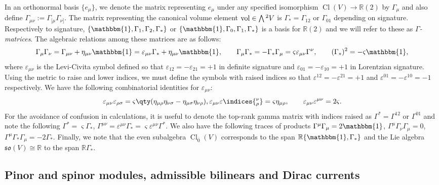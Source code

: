 \documentclass[pdftex]{sigma}
\numberwithin{equation}{section}
\newcommand{\fso}{\mathfrak{so}}
\newcommand{\RR}{\mathbb{R}}
\newcommand{\Wedge}{\mathchoice{{\textstyle\bigwedge}}{\bigwedge}{\bigwedge}{\bigwedge}}	%
\newcommand{\1}{\mathbbm{1}}
\DeclareMathOperator{\Cl}{Cl}
\DeclareMathOperator{\vol}{vol}
\begin{document}
In an orthonormal basis $\{e_\mu\}$, we denote the matrix representing $e_\mu$ under any specified isomorphism $\Cl(V)\to\RR(2)$ by $\Gamma_\mu$ and also define $\Gamma_{\mu\nu}:=\Gamma_{[\mu}\Gamma_{\nu]}$. The matrix representing the canonical volume element $\vol\in\Wedge^2 V$ is $\Gamma_*=\Gamma_{12}$ or $\Gamma_{01}$ depending on signature. Respectively to signature, $\{\1,\Gamma_1,\Gamma_2,\Gamma_*\}$ or $\{\1,\Gamma_0,\Gamma_1,\Gamma_*\}$ is a basis for $\RR(2)$ and we will refer to these as \emph{$\Gamma$-matrices}. The algebraic relations among these matrices are as follows:
\[
	\Gamma_{\mu}\Gamma_{\nu} = \Gamma_{\mu\nu} + \eta_{\mu\nu}\1 = \varepsilon_{\mu\nu}\Gamma_* + \eta_{\mu\nu}\1,
	\qquad	\Gamma_\mu \Gamma_* = -\Gamma_* \Gamma_\mu = \varsigma \varepsilon_{\mu\nu}\Gamma^\nu,
	\qquad (\Gamma_*)^2 = -\varsigma\1,
\]
where $\varepsilon_{\mu\nu}$ is the Levi-Civita symbol defined so that $\varepsilon_{12}=-\varepsilon_{21}=+1$ in definite signature and $\varepsilon_{01}=-\varepsilon_{10}=+1$ in Lorentzian signature. Using the metric to raise and lower indices, we must define the symbols with raised indices so that $\varepsilon^{12}=-\varepsilon^{21}=+1$ and $\varepsilon^{01}=-\varepsilon^{10}=-1$ respectively. We have the following combinatorial identities for $\varepsilon_{\mu\nu}$:
\[
	\varepsilon_{\mu\nu}\varepsilon_{\rho\sigma}
		= \varsigma\qty(\eta_{\mu\rho}\eta_{\nu\sigma} - \eta_{\mu\sigma}\eta_{\nu\rho}),
	\varepsilon_{\mu\nu}\varepsilon\indices{_\rho^\nu}
		= \varsigma\eta_{\mu\rho},\qquad
	\varepsilon_{\mu\nu}\varepsilon^{\mu\nu} = 2\varsigma.
\]
For the avoidance of confusion in calculations, it is useful to denote the top-rank gamma matrix with indices raised as $\Gamma^*=\Gamma^{12}$ or $\Gamma^{01}$ and note the following
$\Gamma^* = \varsigma\Gamma_*$,
$\Gamma^{\mu\nu} = \varepsilon^{\mu\nu}\Gamma_* = \varsigma\varepsilon^{\mu\nu}\Gamma^*$.
We also have the following traces of products
$\Gamma^\mu\Gamma_\mu = 2\1$, $
	\Gamma^\mu\Gamma_\nu\Gamma_\mu = 0$, $
	\Gamma^\mu\Gamma_*\Gamma_\mu = -2\Gamma_*$.
Finally, we note that the even subalgebra $\Cl_{\overline 0}(V)$ corresponds to the span $\RR\{\1,\Gamma_*\}$ and the Lie algebra~${\fso(V)\cong\RR}$ to the span $\RR\Gamma_*$.

\subsection{Pinor and spinor modules, admissible bilinears and Dirac currents}
\label{sec:2d-dirac-currents}
\end{document}

